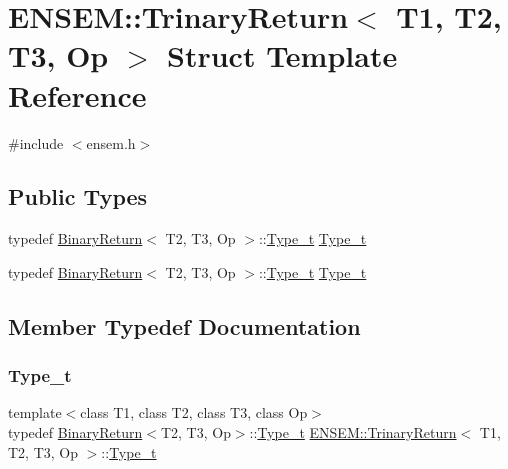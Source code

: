 \hypertarget{structENSEM_1_1TrinaryReturn}{}\section{E\+N\+S\+EM\+:\+:Trinary\+Return$<$ T1, T2, T3, Op $>$ Struct Template Reference}
\label{structENSEM_1_1TrinaryReturn}


{\ttfamily \#include $<$ensem.\+h$>$}

\subsection*{Public Types}
\begin{DoxyCompactItemize}
\item 
typedef \mbox{\hyperlink{structENSEM_1_1BinaryReturn}{Binary\+Return}}$<$ T2, T3, Op $>$\+::\mbox{\hyperlink{structENSEM_1_1TrinaryReturn_a3b5bb49c40f17dcf3bdb007c9e591b0e}{Type\+\_\+t}} \mbox{\hyperlink{structENSEM_1_1TrinaryReturn_a3b5bb49c40f17dcf3bdb007c9e591b0e}{Type\+\_\+t}}
\item 
typedef \mbox{\hyperlink{structENSEM_1_1BinaryReturn}{Binary\+Return}}$<$ T2, T3, Op $>$\+::\mbox{\hyperlink{structENSEM_1_1TrinaryReturn_a3b5bb49c40f17dcf3bdb007c9e591b0e}{Type\+\_\+t}} \mbox{\hyperlink{structENSEM_1_1TrinaryReturn_a3b5bb49c40f17dcf3bdb007c9e591b0e}{Type\+\_\+t}}
\end{DoxyCompactItemize}


\subsection{Member Typedef Documentation}
\mbox{\label{structENSEM_1_1TrinaryReturn_a3b5bb49c40f17dcf3bdb007c9e591b0e}} 
\subsubsection{\texorpdfstring{Type\_t}{Type\_t}\hspace{0.1cm}{\footnotesize\ttfamily [1/2]}}
{\footnotesize\ttfamily template$<$class T1, class T2, class T3, class Op$>$ \\
typedef \mbox{\hyperlink{structENSEM_1_1BinaryReturn}{Binary\+Return}}$<$T2, T3, Op$>$\+::\mbox{\hyperlink{structENSEM_1_1TrinaryReturn_a3b5bb49c40f17dcf3bdb007c9e591b0e}{Type\+\_\+t}} \mbox{\hyperlink{structENSEM_1_1TrinaryReturn}{E\+N\+S\+E\+M\+::\+Trinary\+Return}}$<$ T1, T2, T3, Op $>$\+::\mbox{\hyperlink{structENSEM_1_1TrinaryReturn_a3b5bb49c40f17dcf3bdb007c9e591b0e}{Type\+\_\+t}}}

